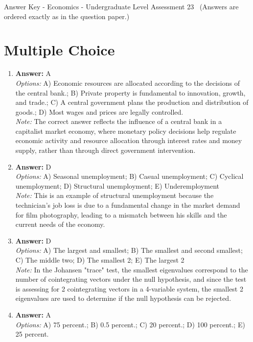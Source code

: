 \documentclass[12pt]{article}
\begin{document}
\begin{center}
Answer Key - Economics - Undergraduate Level Assessment 23 \
\small (Answers are ordered exactly as in the question paper.)
\end{center}

\section*{Multiple Choice}
\begin{enumerate}[label=\arabic*.]
\item \textbf{Answer:} A
\\ \textit{Options:} A) Economic resources are allocated according to the decisions of the central bank.; B) Private property is fundamental to innovation, growth, and trade.; C) A central government plans the production and distribution of goods.; D) Most wages and prices are legally controlled.
\\ \textit{Note:} The correct answer reflects the influence of a central bank in a capitalist market economy, where monetary policy decisions help regulate economic activity and resource allocation through interest rates and money supply, rather than through direct government intervention.
\item \textbf{Answer:} D
\\ \textit{Options:} A) Seasonal unemployment; B) Casual unemployment; C) Cyclical unemployment; D) Structural unemployment; E) Underemployment
\\ \textit{Note:} This is an example of structural unemployment because the technician's job loss is due to a fundamental change in the market demand for film photography, leading to a mismatch between his skills and the current needs of the economy.
\item \textbf{Answer:} D
\\ \textit{Options:} A) The largest and smallest; B) The smallest and second smallest; C) The middle two; D) The smallest 2; E) The largest 2
\\ \textit{Note:} In the Johansen "trace" test, the smallest eigenvalues correspond to the number of cointegrating vectors under the null hypothesis, and since the test is assessing for 2 cointegrating vectors in a 4-variable system, the smallest 2 eigenvalues are used to determine if the null hypothesis can be rejected.
\item \textbf{Answer:} A
\\ \textit{Options:} A) 75 percent.; B) 0.5 percent.; C) 20 percent.; D) 100 percent.; E) 25 percent.

\end{enumerate}
\end{document}
